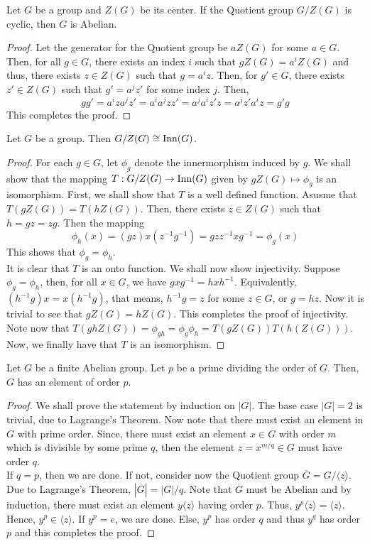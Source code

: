 \begin{theorem}[$G/Z$ Theorem]
	Let $G$ be a group and $Z(G)$ be its center. If the Quotient group $G/Z(G)$ is cyclic, then $G$ is Abelian.
\end{theorem}
\begin{proof}
	Let the generator for the Quotient group be $aZ(G)$ for some $a\in G$. Then, for all $g\in G$, there exists an index $i$ such that $gZ(G) = a^iZ(G)$ and thus, there exists $z\in Z(G)$ such that $g=a^iz$. Then, for $g'\in G$, there exists $z'\in Z(G)$ such that $g'=a^jz'$ for some index $j$. Then,
	$$
	gg' = a^iza^jz' = a^ia^jzz' = a^ja^iz'z = a^jz'a^iz = g'g
	$$
	This completes the proof.
\end{proof}

\begin{proposition}
	Let $G$ be a group. Then $G/Z(G)\cong\operatorname{Inn}(G)$.
\end{proposition}
\begin{proof}
	For each $g\in G$, let $\phi_g$ denote the innermorphism induced by $g$. We shall show that the mapping $T: G/Z(G)\to\operatorname{Inn}(G)$ given by $gZ(G)\mapsto\phi_g$ is an isomorphism. First, we shall show that $T$ is a well defined function. Asusme that $T(gZ(G)) = T(hZ(G))$. Then, there exists $z\in Z(G)$ such that $h = gz = zg$. Then the mapping 
	$$
	\phi_{h}(x) = (gz)x(z^{-1}g^{-1}) = gzz^{-1}xg^{-1} = \phi_{g}(x)
	$$
	This shows that $\phi_g=\phi_h$.\\
	It is clear that $T$ is an onto function. We shall now show injectivity. Suppose $\phi_g=\phi_h$, then, for all $x\in G$, we have $gxg^{-1} = hxh^{-1}$. Equivalently, $(h^{-1}g)x = x(h^{-1}g)$, that means, $h^{-1}g=z$ for some $z\in G$, or $g = hz$. Now it is trivial to see that $gZ(G)=hZ(G)$. This completes the proof of injectivity. Note now that $T(ghZ(G)) = \phi_{gh} = \phi_{g}\phi_{h} = T(gZ(G))T(h(Z(G)))$. Now, we finally have that $T$ is an isomorphism.
\end{proof}

\begin{theorem}
	Let $G$ be a finite Abelian group. Let $p$ be a prime dividing the order of $G$. Then, $G$ has an element of order $p$.
\end{theorem}
\begin{proof}
	We shall prove the statement by induction on $|G|$. The base case $|G|=2$ is trivial, due to Lagrange's Theorem. Now note that there must exist an element in $G$ with prime order. Since, there must exist an element $x\in G$ with order $m$ which is divisible by some prime $q$, then the element $z=x^{m/q}\in G$ must have order $q$.\\
	If $q=p$, then we are done. If not, consider now the Quotient group $\overline{G} = G/\langle z\rangle$. Due to Lagrange's Theorem, $|\overline{G}|=|G|/q$. Note that $\overline{G}$ must be Abelian and by induction, there must exist an element $y\langle z\rangle$ having order $p$. Thus, $y^p\langle z\rangle = \langle z\rangle$. Hence, $y^p\in\langle z\rangle$. If $y^p=e$, we are done. Else, $y^p$ has order $q$ and thus $y^q$ has order $p$ and this completes the proof.
\end{proof}

